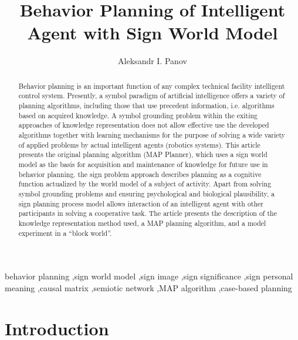 \documentclass[review]{elsarticle}
\begin{document}
\begin{frontmatter}

\title{Behavior Planning of Intelligent Agent with Sign World Model}

\author{Aleksandr I. Panov}

\address{Federal Research Center ``Computer Science and Control'' of RAS, Moscow, Russia\\
National Research University Higher School of Economics, Moscow, Russia}

\begin{abstract}
Behavior planning is an important function of any complex technical facility intelligent control system. Presently, a symbol paradigm of artificial intelligence offers a variety of planning algorithms, including those that use precedent information, i.e. algorithms based on acquired knowledge. A symbol grounding problem within the exiting approaches of knowledge representation does not allow effective use the developed algorithms together with learning mechanisms for the purpose of solving a wide variety of applied problems by actual intelligent agents (robotics systems). This article presents the original planning algorithm (MAP Planner), which uses a sign world model as the basis for acquisition and maintenance of knowledge for future use in behavior planning. the sign problem approach describes planning as a cognitive function actualized by the world model of a subject of activity. Apart from solving symbol grounding problems and ensuring psychological and biological plausibility, a sign planning process model allows interaction of an intelligent agent with other participants in solving a cooperative task. The article presents the description of the knowledge representation method used, a MAP planning algorithm, and a model experiment in a ``block world''.
\end{abstract}

\begin{keyword}
behavior planning \sep sign world model \sep sign image \sep sign significance \sep sign personal meaning \sep causal matrix \sep semiotic network \sep MAP algorithm \sep case-based planning
\end{keyword}

\end{frontmatter}

\linenumbers

\section{Introduction}\label{sec:intro}
\end{document}
